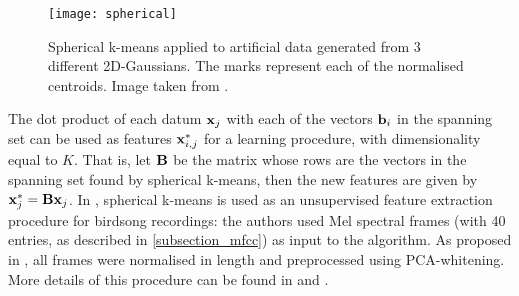 \documentclass[../main.tex]{subfiles} \label{chapter_soa}
\begin{document}
\begin{figure}[t]
\centering
\texttt{[image: spherical]}
\caption{Spherical k-means applied to artificial data generated from 3 different 2D-Gaussians. The marks represent each of the normalised centroids. Image taken from \cite{Stowell2014}.}
\label{fig_spherical}
\end{figure}
\par The dot product of each datum $\mathbf{x}_j$ with each of the vectors $\mathbf{b}_i$ in the spanning set can be used as features $\mathbf{x}^*_{i,j}$ for a learning procedure, with dimensionality equal to $K$. That is, let $\mathbf{B}$ be the matrix whose rows are the vectors in the spanning set found by spherical k-means, then the new features are given by $\mathbf{x}^*_j = \mathbf{Bx}_j$. In \cite{Stowell2014}, spherical k-means is used as an unsupervised feature extraction procedure for birdsong recordings: the authors used Mel spectral frames (with 40 entries, as described in \ref{subsection_mfcc}) as input to the algorithm. As proposed in \cite{Dieleman2013}, all frames were normalised in length and preprocessed using PCA-whitening. More details of this procedure can be found in \cite{Stowell2014} and \cite{Dieleman2013}.
\end{document}
